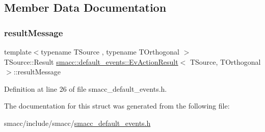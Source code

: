 \subsection{Member Data Documentation}
\mbox{\label{structsmacc_1_1default__events_1_1EvActionResult_a2582f3c97f0061369093c47d5abe5b5a}} 
\subsubsection{\texorpdfstring{result\+Message}{resultMessage}}
{\footnotesize\ttfamily template$<$typename T\+Source , typename T\+Orthogonal $>$ \\
T\+Source\+::\+Result \hyperlink{structsmacc_1_1default__events_1_1EvActionResult}{smacc\+::default\+\_\+events\+::\+Ev\+Action\+Result}$<$ T\+Source, T\+Orthogonal $>$\+::result\+Message}



Definition at line 26 of file smacc\+\_\+default\+\_\+events.\+h.



The documentation for this struct was generated from the following file\+:\begin{DoxyCompactItemize}
\item 
smacc/include/smacc/\hyperlink{smacc__default__events_8h}{smacc\+\_\+default\+\_\+events.\+h}\end{DoxyCompactItemize}
